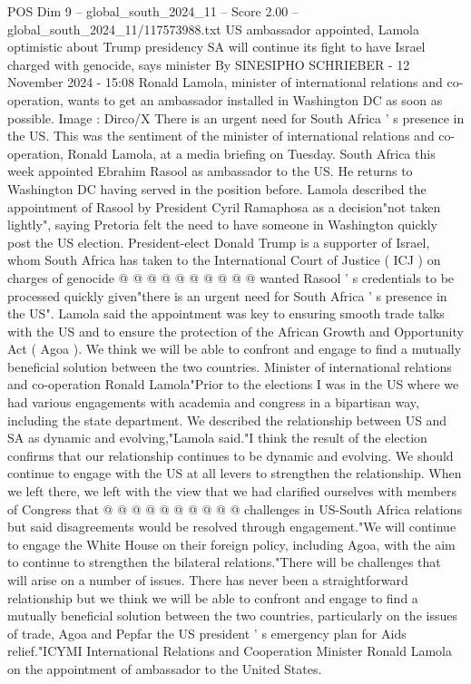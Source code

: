 \begin{textsample}{POS Dim 9 – global\_south\_2024\_11 – Score 2.00 – global\_south\_2024\_11/117573988.txt}  \label{ex:f9_pos_025}
US ambassador appointed, Lamola optimistic about Trump presidency SA will continue its fight to have Israel charged with genocide, says minister By SINESIPHO SCHRIEBER - 12 November 2024 - 15:08 Ronald Lamola, minister of international relations and co-operation, wants to get an ambassador installed in Washington DC as soon as possible.
Image : Dirco/X There is an urgent need for South Africa ' s presence in the US.
This was the sentiment of the minister of international relations and co-operation, Ronald Lamola, at a media briefing on Tuesday.
South Africa this week appointed Ebrahim Rasool as ambassador to the US.
He returns to Washington DC having served in the position before.
Lamola described the appointment of Rasool by President Cyril Ramaphosa as a decision"not taken lightly", saying Pretoria felt the need to have someone in Washington quickly post the US election.
President-elect Donald Trump is a supporter of Israel, whom South Africa has taken to the International Court of Justice ( ICJ ) on charges of genocide @ @ @ @ @ @ @ @ @ @ wanted Rasool ' s credentials to be processed quickly given"there is an urgent need for South Africa ' s presence in the US".
Lamola said the appointment was key to ensuring smooth trade talks with the US and to ensure the protection of the African Growth and Opportunity Act ( Agoa ).
We think we will be able to confront and engage to find a mutually beneficial solution between the two countries.
Minister of international relations and co-operation Ronald Lamola"Prior to the elections I was in the US where we had various engagements with academia and congress in a bipartisan way, including the state department.
We described the relationship between US and SA as dynamic and evolving,"Lamola said."I think the result of the election confirms that our relationship continues to be dynamic and evolving.
We should continue to engage with the US at all levers to strengthen the relationship.
When we left there, we left with the view that we had clarified ourselves with members of Congress that @ @ @ @ @ @ @ @ @ @ challenges in US-South Africa relations but said disagreements would be resolved through engagement."We will continue to engage the White House on their foreign policy, including Agoa, with the aim to continue to strengthen the bilateral relations."There will be challenges that will arise on a number of issues.
There has never been a straightforward relationship but we think we will be able to confront and engage to find a mutually beneficial solution between the two countries, particularly on the issues of trade, Agoa and Pepfar the US president ' s emergency plan for Aids relief."ICYMI International Relations and Cooperation Minister Ronald Lamola on the appointment of ambassador to the United States.

\end{textsample}
